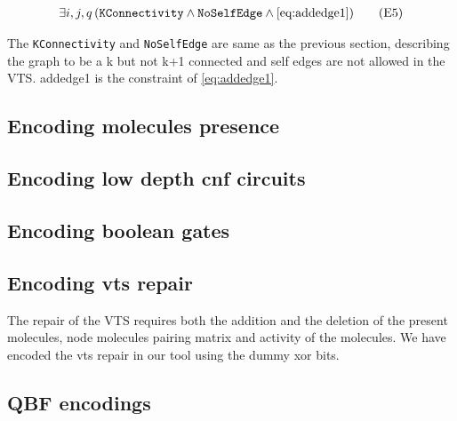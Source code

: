 
\begin{align}
  \exists i, j, q \,
  ( \texttt{KConnectivity}  \land \texttt{NoSelfEdge} \land \ref{eq:addedge1} )    
  \tag{E5}\label{eq:addedge5}
\end{align}


The \texttt{KConnectivity} and \texttt{NoSelfEdge} are same as the previous section, describing the graph to be a k but not k+1 connected and self edges are not allowed in the VTS. addedge1 is the constraint of \ref{eq:addedge1}.


    


 
\subsection{Encoding molecules presence}

\subsection{Encoding low depth cnf circuits}

\subsection{Encoding boolean gates}

\subsection{Encoding vts repair}
The repair of the VTS requires both the addition and the deletion of the present molecules, node molecules pairing matrix and activity of the molecules. We have encoded the vts repair in our tool using the dummy xor bits.


\subsection{QBF encodings}




